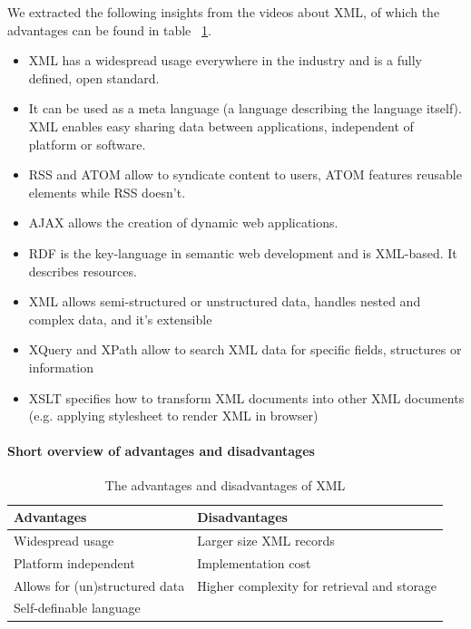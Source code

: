 We extracted the following insights from the videos about XML, of which the advantages can be found in table ~\ref{tab:XmlProsCons}. 
\begin{itemize}
\item
XML has a widespread usage everywhere in the industry and is a fully defined, open standard.
\item
It can be used as a meta language (a language describing the language itself).
XML enables easy sharing data between applications, independent of platform or software.
\item
RSS and ATOM allow to syndicate content to users, ATOM features reusable elements while RSS doesn't.
\item
AJAX allows the creation of dynamic web applications.
\item
RDF is the key-language in semantic web development and is XML-based. It describes resources.
\item
XML allows semi-structured or unstructured data, handles nested and complex data, and it's extensible
\item
XQuery and XPath allow to search XML data for specific fields, structures or information
\item
XSLT specifies how to transform XML documents into other XML documents (e.g. applying stylesheet to render XML in browser)
\end{itemize}

\paragraph{Short overview of advantages and disadvantages}
\mbox{}

\begin{table}[h]
\begin{tabular}{|l|l|}
\hline
	\textbf{\color{OliveGreen}Advantages} & \textbf{\color{Maroon}Disadvantages} \\
	\hline
	Widespread usage & Larger size XML records \\
	Platform independent & Implementation cost \\
	Allows for (un)structured data & Higher complexity for retrieval and storage \\
	Self-definable language & \\
\hline
\end{tabular}
\caption{The advantages and disadvantages of XML}
\label{tab:XmlProsCons}
\end{table}


